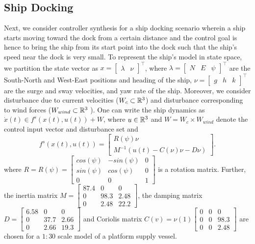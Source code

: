 \subsection{Ship Docking}\label{subsec:6dship}
Next, we consider controller synthesis for a ship docking scenario wherein a ship starts moving toward the dock from a certain distance and the control goal is hence to bring the ship from its start point into the dock such that the ship's speed near the dock is very small. To represent the ship's model in state space, we partition the state vector as $x=\begin{bmatrix}\lambda& \nu\end{bmatrix}^\top$, where $\lambda=\begin{bmatrix}N&E&\psi\end{bmatrix}^\top$ are the South-North and West-East positions and heading of the ship, $\nu = \begin{bmatrix}g &h&k\end{bmatrix}^\top$ are the surge and sway velocities, and yaw rate of the ship. Moreover, we consider disturbance due to current velocities ($W_c\subset\mathbb{R}^3$) and disturbance corresponding to wind forces ($W_{wind}\subset\mathbb{R}^3$ ). One can write the ship dynamics as $\dot x(t)\in f^s(x(t),u(t))+W$, where $u\in\mathbb{R}^3$ and $W=W_c\times W_{wind}$ denote the control input vector and disturbance set and
\begin{equation}\label{eq:ship_ss}
f^{s}(x(t),u(t))=\begin{bmatrix}R(\psi)\nu\\M^{-1}(u(t)-C(\nu)\nu-D\nu)\end{bmatrix}.
\end{equation}
where $R=R(\psi)=\begin{bmatrix}
cos(\psi) &-sin(\psi) &0\\
sin(\psi) & cos(\psi) & 0\\
0 & 0 & 1
\end{bmatrix}$ is a rotation matrix. Further, the inertia matrix $M=\begin{bmatrix}
87.4 & 0 & 0 \\
0 & 98.3 & 2.48 \\
0 & 2.48 & 22.2
\end{bmatrix}$, the damping matrix $D=\begin{bmatrix}
6.58 & 0 & 0 \\
0 & 37.7 & 2.66 \\
0 & 2.66 & 19.3
\end{bmatrix}$ and Coriolis matrix $C(v)=\nu(1)\begin{bmatrix}
0 & 0 & 0 \\
0 & 0 & 98.3 \\
0 & 0 & 2.48
\end{bmatrix}$ are chosen for a $1:30$ scale model of a platform supply vessel.

